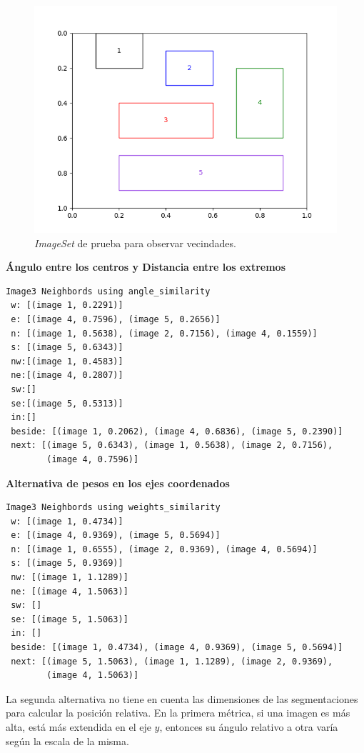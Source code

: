 \begin{figure}[H]
\centering
 \includegraphics[width=\textwidth]{Graphics/regions.png}
\caption{\textit{ImageSet} de prueba para observar vecindades.}
\label{fig:neighbords}
\end{figure}

\noindent\textbf{\'Angulo entre los centros y Distancia entre los extremos}
\begin{verbatim}
Image3 Neighbords using angle_similarity
 w: [(image 1, 0.2291)]
 e: [(image 4, 0.7596), (image 5, 0.2656)]
 n: [(image 1, 0.5638), (image 2, 0.7156), (image 4, 0.1559)]
 s: [(image 5, 0.6343)]
 nw:[(image 1, 0.4583)]
 ne:[(image 4, 0.2807)]
 sw:[]
 se:[(image 5, 0.5313)]
 in:[]
 beside: [(image 1, 0.2062), (image 4, 0.6836), (image 5, 0.2390)]
 next: [(image 5, 0.6343), (image 1, 0.5638), (image 2, 0.7156), 
        (image 4, 0.7596)]
\end{verbatim}

\noindent\textbf{Alternativa de pesos en los ejes coordenados}
\begin{verbatim}
Image3 Neighbords using weights_similarity
 w: [(image 1, 0.4734)]
 e: [(image 4, 0.9369), (image 5, 0.5694)]
 n: [(image 1, 0.6555), (image 2, 0.9369), (image 4, 0.5694)]
 s: [(image 5, 0.9369)]
 nw: [(image 1, 1.1289)]
 ne: [(image 4, 1.5063)]
 sw: []
 se: [(image 5, 1.5063)]
 in: []
 beside: [(image 1, 0.4734), (image 4, 0.9369), (image 5, 0.5694)]
 next: [(image 5, 1.5063), (image 1, 1.1289), (image 2, 0.9369),
        (image 4, 1.5063)]
\end{verbatim}
La segunda alternativa no tiene en cuenta las dimensiones de las segmentaciones para calcular la posición relativa. En la primera métrica, si una imagen es más alta, est\'a más extendida en el eje $y$, entonces su ángulo relativo a otra varía según la escala de la misma.

